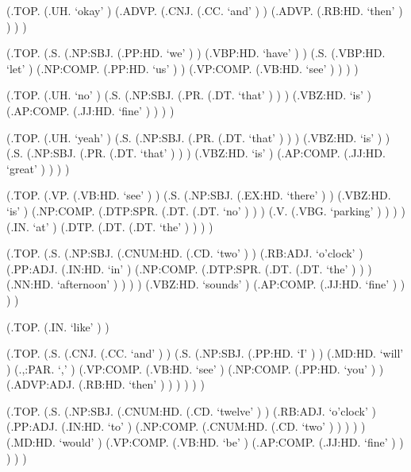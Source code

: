 \documentclass[10pt]{article}
\begin{document}
\begin{parsetree}  (.TOP. (.UH. `okay' ) (.ADVP. (.CNJ. (.CC. `and' ) ) (.ADVP. (.RB:HD. `then' ) ) ) ) \end{parsetree}

\begin{parsetree}  (.TOP. (.S. (.NP:SBJ. (.PP:HD. `we' ) ) (.VBP:HD. `have' ) ) (.S. (.VBP:HD. `let' ) (.NP:COMP. (.PP:HD. `us' ) ) (.VP:COMP. (.VB:HD. `see' ) ) ) ) \end{parsetree}

\begin{parsetree}  (.TOP. (.UH. `no' ) (.S. (.NP:SBJ. (.PR. (.DT. `that' ) ) ) (.VBZ:HD. `is' ) (.AP:COMP. (.JJ:HD. `fine' ) ) ) ) \end{parsetree}

\begin{parsetree}  (.TOP. (.UH. `yeah' ) (.S. (.NP:SBJ. (.PR. (.DT. `that' ) ) ) (.VBZ:HD. `is' ) ) (.S. (.NP:SBJ. (.PR. (.DT. `that' ) ) ) (.VBZ:HD. `is' ) (.AP:COMP. (.JJ:HD. `great' ) ) ) ) \end{parsetree}

\begin{parsetree}  (.TOP. (.VP. (.VB:HD. `see' ) ) (.S. (.NP:SBJ. (.EX:HD. `there' ) ) (.VBZ:HD. `is' ) (.NP:COMP. (.DTP:SPR. (.DT. (.DT. `no' ) ) ) (.V. (.VBG. `parking' ) ) ) ) (.IN. `at' ) (.DTP. (.DT. (.DT. `the' ) ) ) ) \end{parsetree}

\begin{parsetree}  (.TOP. (.S. (.NP:SBJ. (.CNUM:HD. (.CD. `two' ) ) (.RB:ADJ. `o'clock' ) (.PP:ADJ. (.IN:HD. `in' ) (.NP:COMP. (.DTP:SPR. (.DT. (.DT. `the' ) ) ) (.NN:HD. `afternoon' ) ) ) ) (.VBZ:HD. `sounds' ) (.AP:COMP. (.JJ:HD. `fine' ) ) ) ) \end{parsetree}

\begin{parsetree}  (.TOP. (.IN. `like' ) ) \end{parsetree}

\begin{parsetree}  (.TOP. (.S. (.CNJ. (.CC. `and' ) ) (.S. (.NP:SBJ. (.PP:HD. `I' ) ) (.MD:HD. `will' ) (.,:PAR. `,' ) (.VP:COMP. (.VB:HD. `see' ) (.NP:COMP. (.PP:HD. `you' ) ) (.ADVP:ADJ. (.RB:HD. `then' ) ) ) ) ) ) \end{parsetree}

\begin{parsetree}  (.TOP. (.S. (.NP:SBJ. (.CNUM:HD. (.CD. `twelve' ) ) (.RB:ADJ. `o'clock' ) (.PP:ADJ. (.IN:HD. `to' ) (.NP:COMP. (.CNUM:HD. (.CD. `two' ) ) ) ) ) (.MD:HD. `would' ) (.VP:COMP. (.VB:HD. `be' ) (.AP:COMP. (.JJ:HD. `fine' ) ) ) ) ) \end{parsetree}
\end{document}
